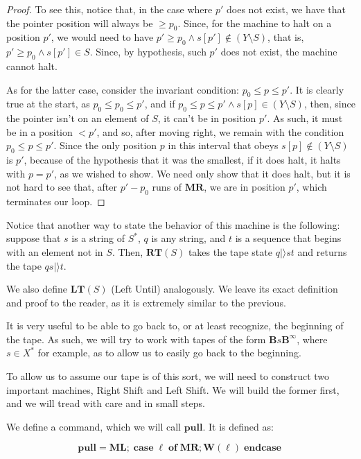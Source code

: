 \documentclass{article}
\newcommand{\B}{\mathbf{B}}
\DeclareMathOperator{\Ncase}{\mathbf{case}}
\DeclareMathOperator{\Nof}{\mathbf{of}}
\DeclareMathOperator{\Nendcase}{\mathbf{endcase}}
\newcommand{\MR}{\mathbf{MR}}
\newcommand{\ML}{\mathbf{ML}}
\newcommand{\W}{\mathbf{W}}
\newcommand{\RT}{\mathbf{RT}}
\newcommand{\LT}{\mathbf{LT}}
\newcommand{\pull}{\mathbf{pull}}
\begin{document}
	\begin{proof}
	To see this, notice that, in the case where $p'$ does not exist, we have that the pointer position will always be $\geq p_0$. Since, for the machine to halt on a position $p'$, we would need to have $p' \geq p_0 \land s[p'] \not \in (Y \setminus S)$, that is, $p' \geq p_0 \land s[p'] \in S$. Since, by hypothesis, such $p'$ does not exist, the machine cannot halt.
	
	As for the latter case, consider the invariant condition: $p_0 \leq p \leq p'$. It is clearly true at the start, as $p_0 \leq p_0 \leq p'$, and if $p_0 \leq p \leq p' \land s[p] \in (Y \setminus S)$, then, since the pointer isn't on an element of $S$, it can't be in position $p'$. As such, it must be in a position $<p'$, and so, after moving right, we remain with the condition $p_0 \leq p \leq p'$. Since the only position $p$ in this interval that obeys $s[p] \not \in (Y \setminus S)$ is $p'$, because of the hypothesis that it was the smallest, if it does halt, it halts with $p = p'$, as we wished to show. We need only show that it does halt, but it is not hard to see that, after $p' - p_0$ runs of $\MR$, we are in position $p'$, which terminates our loop.
	\end{proof} %
	
	Notice that another way to state the behavior of this machine is the following: suppose that $s$ is a string of $S^*$, $q$ is any string, and $t$ is a sequence that begins with an element not in $S$. Then, $\RT(S)$ takes the tape state $q |\rangle s t$ and returns the tape $q s |\rangle t$.
	
	We also define $\LT(S)$ (Left Until) analogously. We leave its exact definition and proof to the reader, as it is extremely similar to the previous.
	
	It is very useful to be able to go back to, or at least recognize, the beginning of the tape. As such, we will try to work with tapes of the form $\B s \B^\infty$, where $s \in X^*$ for example, as to allow us to easily go back to the beginning.
	
	To allow us to assume our tape is of this sort, we will need to construct two important machines, Right Shift and Left Shift. We will build the former first, and we will tread with care and in small steps.
	
	We define a command, which we will call $\pull$. It is defined as:
	
	\[\pull = \ML; \Ncase \ell \Nof \MR; \W(\ell) \Nendcase\]
	
\end{document}
